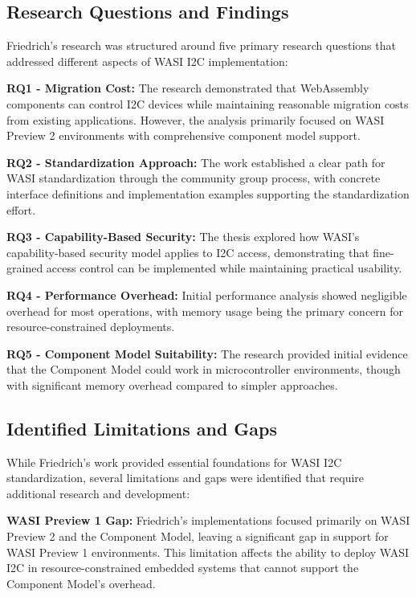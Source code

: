 \subsection{Research Questions and Findings}
\label{subsec:friedrich-research}

Friedrich's research was structured around five primary research questions that addressed different aspects of WASI I2C implementation:

\textbf{RQ1 - Migration Cost:} The research demonstrated that WebAssembly components can control I2C devices while maintaining reasonable migration costs from existing applications. However, the analysis primarily focused on WASI Preview 2 environments with comprehensive component model support.

\textbf{RQ2 - Standardization Approach:} The work established a clear path for WASI standardization through the community group process, with concrete interface definitions and implementation examples supporting the standardization effort.

\textbf{RQ3 - Capability-Based Security:} The thesis explored how WASI's capability-based security model applies to I2C access, demonstrating that fine-grained access control can be implemented while maintaining practical usability.

\textbf{RQ4 - Performance Overhead:} Initial performance analysis showed negligible overhead for most operations, with memory usage being the primary concern for resource-constrained deployments.

\textbf{RQ5 - Component Model Suitability:} The research provided initial evidence that the Component Model could work in microcontroller environments, though with significant memory overhead compared to simpler approaches.

\subsection{Identified Limitations and Gaps}
\label{subsec:friedrich-limitations}

While Friedrich's work provided essential foundations for WASI I2C standardization, several limitations and gaps were identified that require additional research and development:

\textbf{WASI Preview 1 Gap:} Friedrich's implementations focused primarily on WASI Preview 2 and the Component Model, leaving a significant gap in support for WASI Preview 1 environments. This limitation affects the ability to deploy WASI I2C in resource-constrained embedded systems that cannot support the Component Model's overhead.

